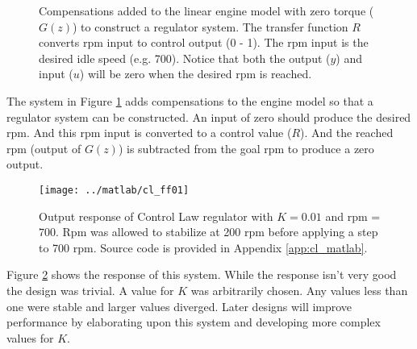 \documentclass{article}
\begin{document}
\begin{figure}[!htp]
\begin{center}


\end{center}

\caption{Compensations added to the linear engine model with zero
torque ($G(z)$) to construct a regulator system.
The transfer function $R$ converts rpm input to control output (0 - 1).
The rpm input is the desired idle speed (e.g. 700).
Notice that both the output ($y$) and input ($u$) will be zero when
the desired rpm is reached.}
\label{fig:clid02}
\end{figure}

The system in Figure \ref{fig:clid02} adds compensations to the
engine model so that a regulator system can be constructed.
An input of zero should produce the desired rpm.
And this rpm input is converted to a control value ($R$).
And the reached rpm (output of $G(z)$) is subtracted from
the goal rpm to produce a zero output.

\begin{figure}[!htp]
\begin{center}
\texttt{[image: ../matlab/cl\_ff01]}
\end{center}
\caption{Output response of Control Law regulator with $K = 0.01$
and rpm = $700$.
Rpm was allowed to stabilize at 200 rpm before applying a step
to 700 rpm.
Source code is provided in Appendix \ref{app:cl_matlab}.}
\label{fig:cl_plot1}
\end{figure}

Figure \ref{fig:cl_plot1} shows the response of this system.
While the response isn't very good the design was trivial.
A value for $K$ was arbitrarily chosen.
Any values less than one were stable and larger values diverged.
Later designs will improve performance by elaborating upon this
system and developing more complex values for $K$.
\end{document}
